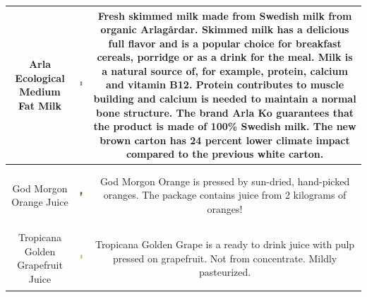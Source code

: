 \begin{table}[!ht]
{\begin{tabular}{c c c}
         \toprule 
         \multicolumn{1}{p{1.5cm}}{\vspace{-18mm} {\footnotesize Arla Ecological Medium Fat Milk} } &
         \includegraphics[width=21mm, height=21mm]{PaperB/appendix/figures/iconic_images/Arla-Ecological-Medium-Fat-Milk_Iconic.jpg} & 
         \multicolumn{1}{p{12cm}}{\vspace{-22mm} {\footnotesize Fresh skimmed milk made from Swedish milk from organic Arlagårdar. Skimmed milk has a delicious full flavor and is a popular choice for breakfast cereals, porridge or as a drink for the meal. Milk is a natural source of, for example, protein, calcium and vitamin B12. Protein contributes to muscle building and calcium is needed to maintain a normal bone structure. The brand Arla Ko guarantees that the product is made of 100\% Swedish milk. The new brown carton has 24 percent lower climate impact compared to the previous white carton.} } \\
         
         
        \toprule
         \multicolumn{1}{p{1.5cm}}{\vspace{-17mm} {\footnotesize God Morgon Orange Juice} } &
          \includegraphics[width=21mm, height=21mm]{PaperB/appendix/figures/iconic_images/God-Morgon-Orange-Juice_Clean.jpg}  & 
         \multicolumn{1}{p{12cm}}{\vspace{-15mm} {\footnotesize God Morgon Orange is pressed by sun-dried, hand-picked oranges. The package contains juice from 2 kilograms of oranges!} } \\
         
         \toprule
         \multicolumn{1}{p{1.5cm}}{\vspace{-18mm} {\footnotesize Tropicana Golden Grapefruit Juice} } &
          \includegraphics[width=21mm, height=21mm]{PaperB/appendix/figures/iconic_images/Tropicana-Golden-Grapefruit_Clean.jpg}  & 
         \multicolumn{1}{p{12cm}}{\vspace{-17mm} {\footnotesize Tropicana Golden Grape is a ready to drink juice with pulp pressed on grapefruit. Not from concentrate. Mildly pasteurized.} } \\
         

\end{tabular}}
\end{table}
